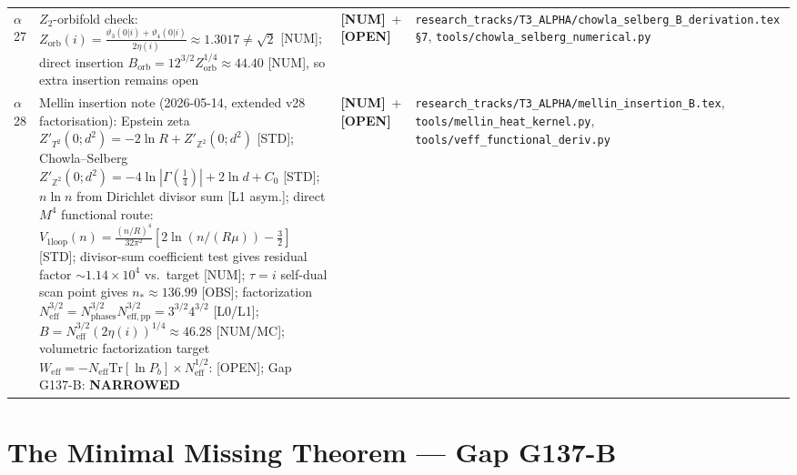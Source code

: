 \documentclass[12pt,a4paper]{article}
\theoremstyle{definition}
\theoremstyle{remark}
\newcommand{\NUM}{\textbf{[NUM]}}
\newcommand{\OPEN}{\textbf{[OPEN]}}
\begin{document}
\begin{longtable}{p{0.8cm} p{6.8cm} p{1.6cm} p{4.5cm}}
$\alpha$27 & $Z_2$-orbifold check:
  $Z_{\mathrm{orb}}(i)=\frac{\vartheta_3(0|i)+\vartheta_4(0|i)}{2\eta(i)}\approx1.3017\neq\sqrt{2}$ [NUM];
  direct insertion $B_{\mathrm{orb}}=12^{3/2}Z_{\mathrm{orb}}^{1/4}\approx44.40$ [NUM], so extra insertion remains open &
  \NUM\ + \OPEN &
  \texttt{research\_tracks/T3\_ALPHA/chowla\_selberg\_B\_derivation.tex \S7},
  \texttt{tools/chowla\_selberg\_numerical.py} \\[4pt]
$\alpha$28 & Mellin insertion note (2026-05-14, extended v28 factorisation):
  Epstein zeta $Z'_{T^2}(0; d^2)=-2\ln R + Z'_{\mathbb{Z}^2}(0; d^2)$ [STD];
  Chowla--Selberg $Z'_{\mathbb{Z}^2}(0; d^2)=-4\ln|\Gamma(\tfrac14)|+2\ln d+C_0$ [STD];
  $n\ln n$ from Dirichlet divisor sum [L1 asym.];
  direct $M^4$ functional route:
  $V_{1\mathrm{loop}}(n)=\frac{(n/R)^4}{32\pi^2}[2\ln(n/(R\mu))-\frac32]$ [STD];
  divisor-sum coefficient test gives residual factor $\sim1.14\times10^4$ vs.\ target [NUM];
  \(\tau=i\) self-dual scan point gives \(n_*\approx136.99\) [OBS];
  factorization \(N_{\mathrm{eff}}^{3/2}=N_{\mathrm{phases}}^{3/2}N_{\mathrm{eff,pp}}^{3/2}=3^{3/2}4^{3/2}\) [L0/L1];
  $B=N_{\mathrm{eff}}^{3/2}(2\eta(i))^{1/4}\approx46.28$ [NUM/MC];
  volumetric factorization target \(W_{\mathrm{eff}}=-N_{\mathrm{eff}}\mathrm{Tr}[\ln P_b]\times N_{\mathrm{eff}}^{1/2}\): [OPEN];
  Gap G137-B: \textbf{NARROWED} &
  \NUM\ + \OPEN &
  \texttt{research\_tracks/T3\_ALPHA/mellin\_insertion\_B.tex},
  \texttt{tools/mellin\_heat\_kernel.py},
  \texttt{tools/veff\_functional\_deriv.py} \\[4pt]

\end{longtable}

\section{The Minimal Missing Theorem — Gap G137-B}
\label{sec:gap}
\end{document}
